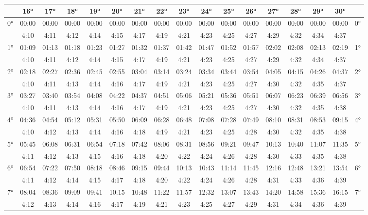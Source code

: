 \begin{scriptsize}\begin{tabular}{c || c | c | c | c | c | c | c | c | c | c | c | c | c | c | c || c}
		\space &16°&17°&18°&19°&20°&21°&22°&23°&24°&25°&26°&27°&28°&29°&30°\\\hline\hline
		\multirow{2}{*}{0°}&00:00&00:00&00:00&00:00&00:00&00:00&00:00&00:00&00:00&00:00&00:00&00:00&00:00&00:00&00:00&\multirow{2}{*}{0°}\\ \space&4:10&4:11&4:12&4:14&4:15&4:17&4:19&4:21&4:23&4:25&4:27&4:29&4:32&4:34&4:37&\space\\\hline
		\multirow{2}{*}{1°}&01:09&01:13&01:18&01:23&01:27&01:32&01:37&01:42&01:47&01:52&01:57&02:02&02:08&02:13&02:19&\multirow{2}{*}{1°}\\ \space&4:10&4:11&4:12&4:14&4:15&4:17&4:19&4:21&4:23&4:25&4:27&4:29&4:32&4:34&4:37&\space\\\hline
		\multirow{2}{*}{2°}&02:18&02:27&02:36&02:45&02:55&03:04&03:14&03:24&03:34&03:44&03:54&04:05&04:15&04:26&04:37&\multirow{2}{*}{2°}\\ \space&4:10&4:11&4:13&4:14&4:16&4:17&4:19&4:21&4:23&4:25&4:27&4:30&4:32&4:35&4:37&\space\\\hline
		\multirow{2}{*}{3°}&03:27&03:40&03:54&04:08&04:22&04:37&04:51&05:06&05:21&05:36&05:51&06:07&06:23&06:39&06:56&\multirow{2}{*}{3°}\\ \space&4:10&4:11&4:13&4:14&4:16&4:17&4:19&4:21&4:23&4:25&4:27&4:30&4:32&4:35&4:38&\space\\\hline
		\multirow{2}{*}{4°}&04:36&04:54&05:12&05:31&05:50&06:09&06:28&06:48&07:08&07:28&07:49&08:10&08:31&08:53&09:15&\multirow{2}{*}{4°}\\ \space&4:10&4:12&4:13&4:14&4:16&4:18&4:19&4:21&4:23&4:25&4:28&4:30&4:32&4:35&4:38&\space\\\hline
		\multirow{2}{*}{5°}&05:45&06:08&06:31&06:54&07:18&07:42&08:06&08:31&08:56&09:21&09:47&10:13&10:40&11:07&11:35&\multirow{2}{*}{5°}\\ \space&4:11&4:12&4:13&4:15&4:16&4:18&4:20&4:22&4:24&4:26&4:28&4:30&4:33&4:35&4:38&\space\\\hline
		\multirow{2}{*}{6°}&06:54&07:22&07:50&08:18&08:46&09:15&09:44&10:13&10:43&11:14&11:45&12:16&12:48&13:21&13:54&\multirow{2}{*}{6°}\\ \space&4:11&4:12&4:14&4:15&4:17&4:18&4:20&4:22&4:24&4:26&4:28&4:31&4:33&4:36&4:39&\space\\\hline
		\multirow{2}{*}{7°}&08:04&08:36&09:09&09:41&10:15&10:48&11:22&11:57&12:32&13:07&13:43&14:20&14:58&15:36&16:15&\multirow{2}{*}{7°}\\ \space&4:12&4:13&4:14&4:16&4:17&4:19&4:21&4:23&4:25&4:27&4:29&4:31&4:34&4:36&4:39&\space\\\hline

\end{tabular}
\end{scriptsize}
